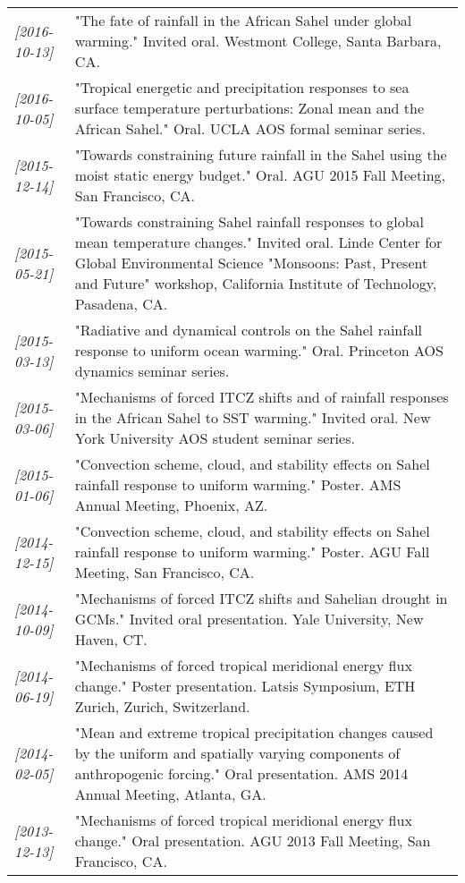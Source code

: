 \documentclass[12pt,letterpaper]{shillcv}
\begin{document}
\begin{center}
\begin{tabularx}{\textwidth}{lX}
\textit{[2016-10-13]} & "The fate of rainfall in the African Sahel under global warming."  Invited oral.  Westmont College, Santa Barbara, CA.\\
\textit{[2016-10-05]} & "Tropical energetic and precipitation responses to sea surface temperature perturbations: Zonal mean and the African Sahel."  Oral.  UCLA AOS formal seminar series.\\
\textit{[2015-12-14]} & "Towards constraining future rainfall in the Sahel using the moist static energy budget." Oral.  AGU 2015 Fall Meeting, San Francisco, CA.\\
\textit{[2015-05-21]} & "Towards constraining Sahel rainfall responses to global mean temperature changes."  Invited oral.  Linde Center for Global Environmental Science "Monsoons: Past, Present and Future" workshop, California Institute of Technology, Pasadena, CA.\\
\textit{[2015-03-13]} & "Radiative and dynamical controls on the Sahel rainfall response to uniform ocean warming."  Oral.  Princeton AOS dynamics seminar series.\\
\textit{[2015-03-06]} & "Mechanisms of forced ITCZ shifts and of rainfall responses in the African Sahel to SST warming."  Invited oral.  New York University AOS student seminar series.\\
\textit{[2015-01-06]} & "Convection scheme, cloud, and stability effects on Sahel rainfall response to uniform warming."  Poster.  AMS Annual Meeting, Phoenix, AZ.\\
\textit{[2014-12-15]} & "Convection scheme, cloud, and stability effects on Sahel rainfall response to uniform warming."  Poster.  AGU Fall Meeting, San Francisco, CA.\\
\textit{[2014-10-09]} & "Mechanisms of forced ITCZ shifts and Sahelian drought in GCMs."  Invited oral presentation.  Yale University, New Haven, CT.\\
\textit{[2014-06-19]} & "Mechanisms of forced tropical meridional energy flux change."  Poster presentation.  Latsis Symposium, ETH Zurich, Zurich, Switzerland.\\
\textit{[2014-02-05]} & "Mean and extreme tropical precipitation changes caused by the uniform and spatially varying components of anthropogenic forcing."  Oral presentation.  AMS 2014 Annual Meeting, Atlanta, GA.\\
\textit{[2013-12-13]} & "Mechanisms of forced tropical meridional energy flux change."  Oral presentation.  AGU 2013 Fall Meeting, San Francisco, CA.\\

\end{tabularx}
\end{center}
\end{document}
